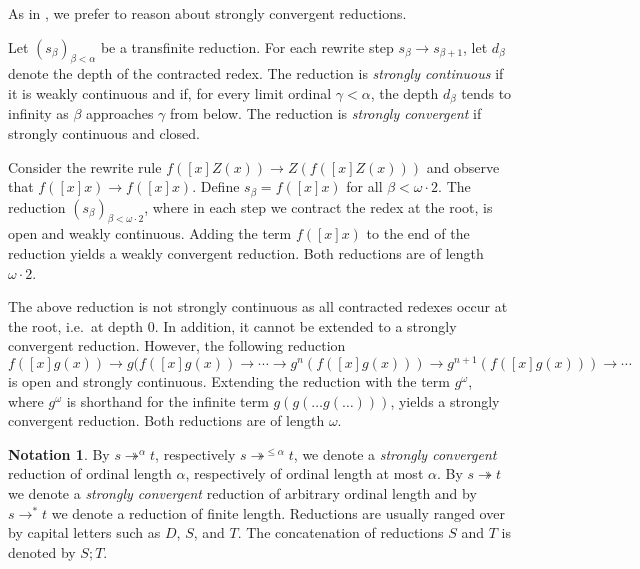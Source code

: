 \documentclass{LMCS}
\theoremstyle{plain}
\theoremstyle{definition}
\newtheorem{notation}[thm]{Notation}
\newcommand{\rew}{\rightarrow}
\newcommand{\rewt}{\rightarrow^*}
\newcommand{\trewt}{\twoheadrightarrow}
\newcommand{\trewtp}[1]{\twoheadrightarrow^{#1}}
\begin{document}
As in \cite{KKSV95,KKSV97,T03_KV}, we prefer to reason about strongly
convergent reductions.

\begin{defi}
Let $(s_\beta)_{\beta < \alpha}$ be a transfinite reduction. For each
rewrite step $s_\beta \rew s_{\beta + 1}$, let $d_\beta$ denote the
depth of the contracted redex. The reduction is \emph{strongly
  continuous} if it is weakly continuous and if, for every limit ordinal $\gamma < \alpha$, the depth $d_\beta$ tends to infinity as $\beta$ approaches $\gamma$ from below. The reduction is \emph{strongly convergent} if strongly continuous and closed.
\end{defi}

\begin{exa}
\label{ex:wconv}
Consider the rewrite rule $f([x]Z(x)) \rew Z(f([x]Z(x)))$ and observe that $f([x]x) \rew f([x]x)$. Define $s_\beta = f([x]x)$ for all $\beta < \omega \cdot 2$. The reduction $(s_\beta)_{\beta < \omega \cdot 2}$, where in each step we contract the redex at the root, is open and weakly continuous. Adding the term $f([x]x)$ to the end of the reduction yields a weakly convergent reduction. Both reductions are of length $\omega \cdot 2$.

The above reduction is not strongly continuous as all contracted redexes occur at the root, i.e.\ at depth $0$. 
In addition, it cannot be extended to a strongly convergent reduction.
However,
the following reduction
\[
f([x]g(x)) \rew g(f([x]g(x)) \rew \cdots \rew g^n(f([x]g(x))) \rew g^{n + 1}(f([x]g(x))) \rew \cdots
\]
is open and strongly continuous. Extending the reduction with the term $g^\omega$, where $g^\omega$ is shorthand for the infinite term $g(g(\ldots g(\ldots)))$, yields a strongly convergent reduction. Both reductions are of length $\omega$.
\end{exa}





\begin{notation}
By $s \trewtp{\alpha} t$, respectively $s \trewtp{\leq \alpha} t$, we
denote a \emph{strongly convergent} reduction of ordinal
length $\alpha$, respectively of ordinal length at most
$\alpha$. By $s \trewt t$ we denote a \emph{strongly convergent}
reduction of arbitrary ordinal length and by $s \rewt t$
we denote a reduction of finite length.
Reductions are usually ranged over by
capital letters such as $D$, $S$, and $T$.
The concatenation of reductions $S$ and $T$ 
is denoted by $S ; T$.
\end{notation}
\end{document}
